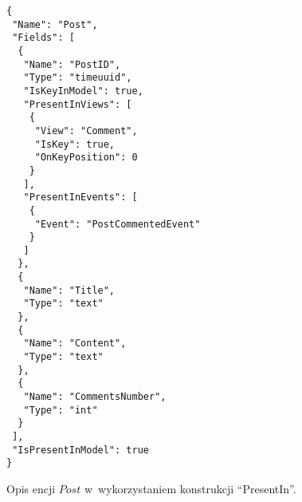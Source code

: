 \begin{figure}[!ht]
\begin{verbatim}
{
 "Name": "Post",
 "Fields": [
  {
   "Name": "PostID",
   "Type": "timeuuid",
   "IsKeyInModel": true,
   "PresentInViews": [
    {
     "View": "Comment",
     "IsKey": true,
     "OnKeyPosition": 0
    }
   ],
   "PresentInEvents": [
    {
     "Event": "PostCommentedEvent"
    }
   ]
  },
  {
   "Name": "Title",
   "Type": "text"
  },
  {
   "Name": "Content",
   "Type": "text"
  },
  {
   "Name": "CommentsNumber",
   "Type": "int"
  }
 ],
 "IsPresentInModel": true
}
\end{verbatim}
\caption{Opis encji $Post$ w~wykorzystaniem konstrukcji ``PresentIn''.}
\label{fig:single:model_presentIn}
\end{figure}
